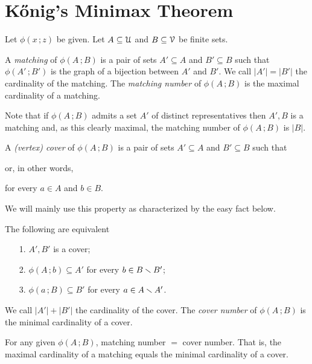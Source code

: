 \documentclass[scombinatorics.tex]{subfiles}
\begin{document}
\section{K\H{o}nig's Minimax Theorem}\label{Konig}

Let $\phi(x\,;z)$ be given. 
Let $A\subseteq\EuScript U$ and $B\subseteq\EuScript V$ be finite sets. 

A \emph{matching\/} of $\phi(A\,;B)$ is a pair of sets $A'\subseteq A$  and $B'\subseteq B$ such that $\phi(A'\,;B')$ is the graph of a bijection between $A'$ and $B'$.
We call $|A'|=|B'|$ the cardinality of the matching.
The \emph{matching number} of $\phi(A\,;B)$ is the maximal cardinality of a matching.

Note that if $\phi(A\,;B)$ admits a set $A'$ of distinct representatives then $A',B$ is a matching and, as this clearly maximal, the matching number of $\phi(A\,;B)$ is $|B|$.

A \emph{(vertex) cover\/} of $\phi(A\,;B)$ is a pair of sets $A'\subseteq A$ and $B'\subseteq B$ such that 


or, in other words,

\hfill for every $a\in A$ and $b\in B$.

We will mainly use this property as characterized by the easy fact below.

\begin{fact}\label{fact_cover}
   The following are equivalent
   \begin{itemize}
      \item[1.] $A',B'$ is a cover;
      \item[2.] $\phi(A\,;b)\subseteq A'$ for every $b\in B\smallsetminus B'$;
      \item[3.] $\phi(a\,;B)\subseteq B'$ for every $a\in A\smallsetminus A'$.\QED
   \end{itemize}
\end{fact}

We call $|A'|+|B'|$ the cardinality of the cover.
The \emph{cover number\/} of $\phi(A\,;B)$ is the minimal cardinality of a cover.


\begin{void_thm}
   For any given  $\phi(A\,;B)$, matching number $=$ cover number.
   That is, the maximal cardinality of a matching equals the minimal cardinality of a cover.
\end{void_thm}
\end{document}
